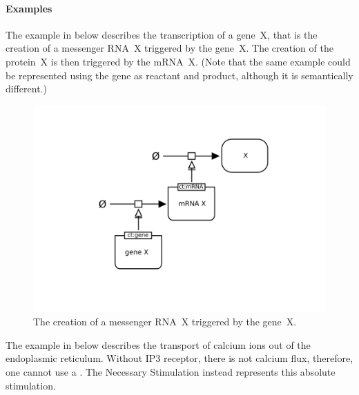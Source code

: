 \paragraph{Examples}

The example in  below describes the
transcription of a gene~X, that is the creation of a messenger RNA~X
triggered by the gene~X.  The creation of the protein~X is then
triggered by the mRNA~X.  (Note that the same example could be
represented using the gene as reactant and product, although it is
semantically different.)

\begin{figure}[htb]
  \centering
  \includegraphics[scale = 0.4]{examples/necessary_stim-genetic}
  \caption{The creation of a messenger RNA~X triggered by the gene~X.}
  \label{fig:techref:necessary_stim-gene}
\end{figure}


The example in  below describes the
transport of calcium ions out of the endoplasmic reticulum. Without
IP3 receptor, there is not calcium flux, therefore, one cannot use a
. The Necessary Stimulation instead represents this
absolute stimulation.

